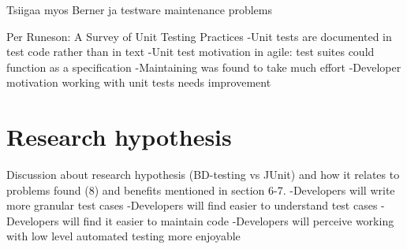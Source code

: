    Tsiigaa myos Berner ja testware maintenance problems~\cite{berner2005observations}

   Per Runeson: A Survey of Unit Testing Practices\newline
   -Unit tests are documented in test code rather than in text\newline
   -Unit test motivation in agile: test suites could function as a specification\newline
   -Maintaining was found to take much effort\newline
   -Developer motivation working with unit tests needs improvement\newline
\section{Research hypothesis} %
    Discussion about research hypothesis (BD-testing vs JUnit) and how it relates to problems found (8) and benefits mentioned in section 6-7.\newline
    -Developers will write more granular test cases\newline
    -Developers will find easier to understand test cases\newline
    -Developers will find it easier to maintain code\newline
    -Developers will perceive working with low level automated testing more enjoyable\newline
